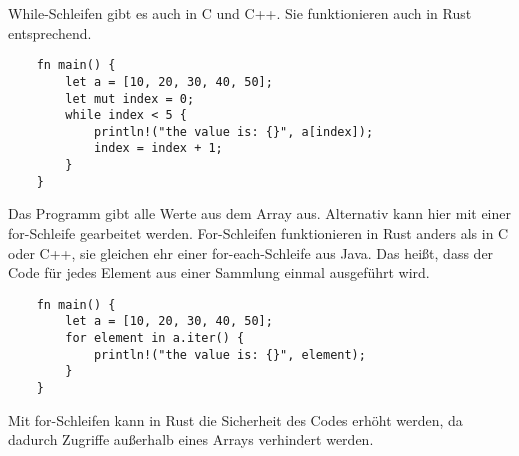 While-Schleifen gibt es auch in C und C++. Sie funktionieren auch in Rust entsprechend.

\begin{lstlisting}
    fn main() {
        let a = [10, 20, 30, 40, 50];
        let mut index = 0;
        while index < 5 {
            println!("the value is: {}", a[index]);
            index = index + 1;
        }
    }
\end{lstlisting}

Das Programm gibt alle Werte aus dem Array aus. Alternativ kann hier mit einer for-Schleife gearbeitet werden. For-Schleifen funktionieren in Rust anders als in C oder C++, sie gleichen ehr einer for-each-Schleife aus Java. Das heißt, dass der Code für jedes Element aus einer Sammlung einmal ausgeführt wird.

\begin{lstlisting}
    fn main() {
        let a = [10, 20, 30, 40, 50];
        for element in a.iter() {
            println!("the value is: {}", element);
        }
    }
\end{lstlisting}

Mit for-Schleifen kann in Rust die Sicherheit des Codes erhöht werden, da dadurch Zugriffe außerhalb eines Arrays verhindert werden.
